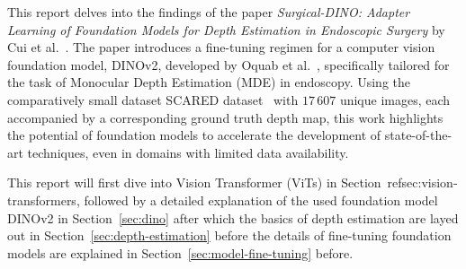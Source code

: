 This report delves into the findings of the paper \emph{Surgical-DINO: Adapter Learning of Foundation Models for Depth Estimation in Endoscopic Surgery} by Cui et al.~\cite{Cui2024}. 
The paper introduces a fine-tuning regimen for a computer vision foundation model, DINOv2, developed by Oquab et al.~\cite{Oquab2023}, specifically tailored for the task of Monocular Depth Estimation (MDE) in endoscopy. 
Using the comparatively small dataset SCARED dataset~\cite{Allan2021} with $17\,607$ unique images, each accompanied by a corresponding ground truth depth map, this work highlights the potential of foundation models to accelerate the development of state-of-the-art techniques, even in domains with limited data availability.

This report will first dive into Vision Transformer (ViTs) in Section~ref{sec:vision-transformers}, followed by a detailed explanation of the used foundation model DINOv2 in Section~\ref{sec:dino} after which the basics of depth estimation are layed out in Section~\ref{sec:depth-estimation} before the details of fine-tuning foundation models are explained in Section~\ref{sec:model-fine-tuning} before.
